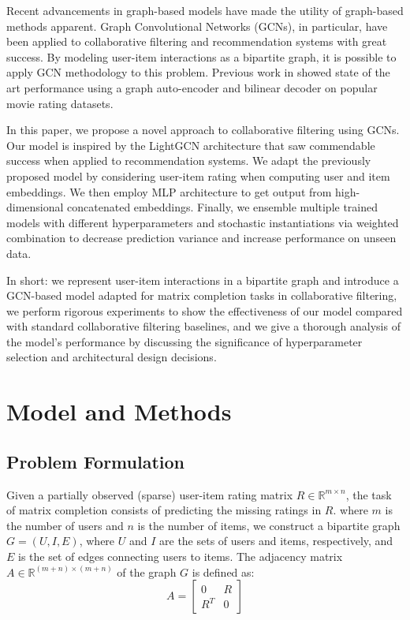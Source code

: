 \documentclass[10pt,conference,compsocconf]{IEEEtran}
\begin{document}
Recent advancements in graph-based models have made the utility of graph-based methods apparent. Graph Convolutional Networks (GCNs), in particular, have been applied to collaborative filtering and recommendation systems with great success. By modeling user-item interactions as a bipartite graph, it is possible to apply GCN methodology to this problem. Previous work in \cite{van2017graph} showed state of the art performance using a graph auto-encoder and bilinear decoder on popular movie rating datasets.

In this paper, we propose a novel approach to collaborative filtering using GCNs. Our model is inspired by the LightGCN \cite{he2020lightgcn} architecture that saw commendable success when applied to recommendation systems. We adapt the previously proposed model by considering user-item rating when computing user and item embeddings. We then employ MLP architecture to get output from high-dimensional concatenated embeddings. Finally, we ensemble multiple trained models with different hyperparameters and stochastic instantiations via weighted combination to decrease prediction variance and increase performance on unseen data.

In short: we represent user-item interactions in a bipartite graph and introduce a GCN-based model adapted for matrix completion tasks in collaborative filtering, we perform rigorous experiments to show the effectiveness of our model compared with standard collaborative filtering baselines, and we give a thorough analysis of the model's performance by discussing the significance of hyperparameter selection and architectural design decisions.

\section{Model and Methods}
\subsection{Problem Formulation}
Given a partially observed (sparse) user-item rating matrix $R \in \mathbb{R}^{m \times n}$, the task of matrix completion consists of predicting the missing ratings in $R$.
where $m$ is the number of users and $n$ is the number of items, we construct a bipartite graph $G = (U, I, E)$, where $U$ and $I$ are the sets of users and items, respectively, and $E$ is the set of edges connecting users to items.
The adjacency matrix $A \in \mathbb{R}^{(m+n) \times (m+n)}$ of the graph $G$ is defined as:
\begin{equation}
    A = \begin{bmatrix}
    0 & R \\
    R^T & 0
    \end{bmatrix}
\end{equation}
\end{document}
